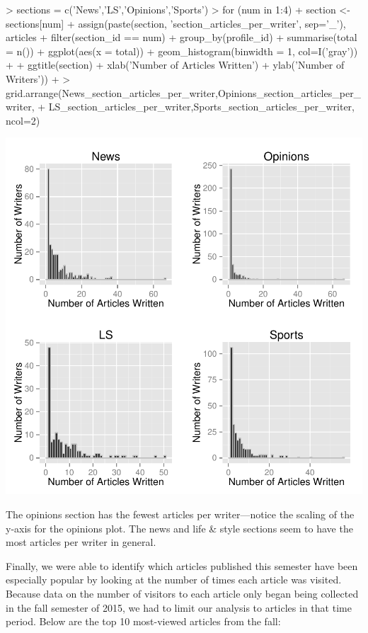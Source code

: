 \documentclass[a4paper]{article}
\begin{document}
\begin{Schunk}
\begin{Sinput}
> sections = c('News','LS','Opinions','Sports')
> for (num in 1:4) {
+   section <- sections[num]
+   assign(paste(section, 'section_articles_per_writer', sep='_'), articles %
+     filter(section_id == num) %
+     group_by(profile_id) %
+     summarise(total = n()) %
+     ggplot(aes(x = total)) + geom_histogram(binwidth = 1, col=I('gray')) +
+     ggtitle(section) + xlab('Number of Articles Written') + ylab('Number of Writers'))
+ }
> grid.arrange(News_section_articles_per_writer,Opinions_section_articles_per_writer,
+              LS_section_articles_per_writer,Sports_section_articles_per_writer, ncol=2)
\end{Sinput}
\end{Schunk}
\includegraphics{FinalProject-019}

The opinions section has the fewest articles per writer---notice the scaling of the y-axis for the opinions plot. The news and life \& style sections seem to have the most articles per writer in general.

Finally, we were able to identify which articles published this semester have been especially popular by looking at the number of times each article was visited. Because data on the number of visitors to each article only began being collected in the fall semester of 2015, we had to limit our analysis to articles in that time period. Below are the top 10 most-viewed articles from the fall:
\end{document}
